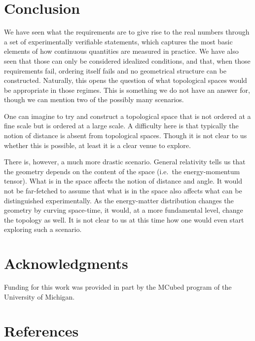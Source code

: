 \documentclass[12pt]{iopart}
\begin{document}
\section{Conclusion}

We have seen what the requirements are to give rise to the real numbers through a set of experimentally verifiable statements, which captures the most basic elements of how continuous quantities are measured in practice. We have also seen that those can only be considered idealized conditions, and that, when those requirements fail, ordering itself fails and no geometrical structure can be constructed. Naturally, this opens the question of what topological spaces would be appropriate in those regimes. This is something we do not have an answer for, though we can mention two of the possibly many scenarios.

One can imagine to try and construct a topological space that is not ordered at a fine scale but is ordered at a large scale. A difficulty here is that typically the notion of distance is absent from topological spaces. Though it is not clear to us whether this is possible, at least it is a clear venue to explore.

There is, however, a much more drastic scenario. General relativity tells us that the geometry depends on the content of the space (i.e.~the energy-momentum tensor). What is in the space affects the notion of distance and angle. It would not be far-fetched to assume that what is in the space also affects what can be distinguished experimentally. As the energy-matter distribution changes the geometry by curving space-time, it would, at a more fundamental level, change the topology as well. It is not clear to us at this time how one would even start exploring such a scenario.


\section*{Acknowledgments}

Funding for this work was provided in part by the MCubed program of the University of Michigan.

\section*{References}



\end{document}
